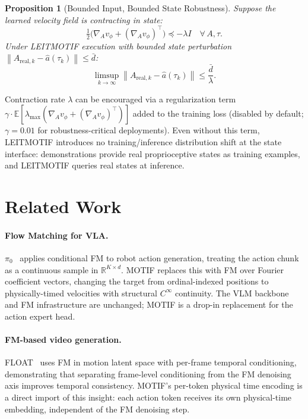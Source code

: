 \documentclass[11pt]{article}
\theoremstyle{plain}
\newtheorem{proposition}[theorem]{Proposition}
\theoremstyle{definition}
\newcommand{\R}{\mathbb{R}}
\newcommand{\E}{\mathbb{E}}
\newcommand{\norm}[1]{\left\lVert#1\right\rVert}
\newcommand{\vnet}{v_\phi}
\newcommand{\texec}{\tau}
\begin{document}
\begin{proposition}[Bounded Input, Bounded State Robustness]
\label{prop:bibs}
Suppose the learned velocity field is contracting in state:
\begin{equation}
  \tfrac{1}{2}\bigl(\nabla_A \vnet + (\nabla_A \vnet)^\top\bigr)
  \preceq -\lambda I \quad \forall\,A, \texec.
\end{equation}
Under LEITMOTIF execution with bounded state perturbation
$\norm{A_{\mathrm{real},k} - \hat{a}(\texec_k)} \leq \bar{d}$:
\begin{equation}
  \limsup_{k \to \infty}\norm{A_{\mathrm{real},k} - \hat{a}(\texec_k)}
  \leq \frac{\bar{d}}{\lambda}.
\end{equation}
\end{proposition}

Contraction rate $\lambda$ can be encouraged via a regularization term
$\gamma \cdot \E[\lambda_{\max}(\nabla_A \vnet + (\nabla_A \vnet)^\top)]$
added to the training loss (disabled by default; $\gamma = 0.01$ for
robustness-critical deployments).
Even without this term, LEITMOTIF introduces no training/inference
distribution shift at the state interface: demonstrations provide real
proprioceptive states as training examples, and LEITMOTIF queries real
states at inference.

\section{Related Work}
\label{sec:related}

\paragraph{Flow Matching for VLA.}
$\pi_0$~\cite{black2024pi0} applies conditional FM to robot action generation,
treating the action chunk as a continuous sample in $\R^{K \times d}$.
MOTIF replaces this with FM over Fourier coefficient vectors, changing the
target from ordinal-indexed positions to physically-timed velocities with
structural $C^\infty$ continuity.
The VLM backbone and FM infrastructure are unchanged; MOTIF is a drop-in
replacement for the action expert head.

\paragraph{FM-based video generation.}
FLOAT~\cite{ki2025float} uses FM in motion latent space with per-frame
temporal conditioning, demonstrating that separating frame-level
conditioning from the FM denoising axis improves temporal consistency.
MOTIF's per-token physical time encoding is a direct import of this
insight: each action token receives its own physical-time embedding,
independent of the FM denoising step.
\end{document}
